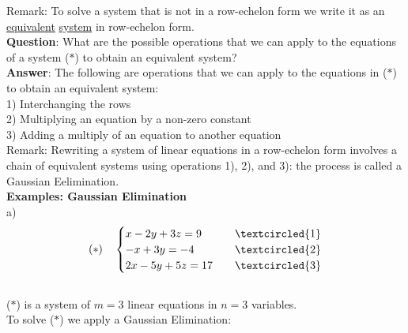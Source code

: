\documentclass{jhwhw}
\begin{document}
Remark: To solve a system that is not in a row-echelon form we write it as an \underline{equivalent} \underline{system} in row-echelon form.
\\

\textbf{Question}: What are the possible operations that we can apply to the equations of a system (\(\ast\)) to obtain an equivalent system?
\\
\textbf{Answer}: The following are operations that we can apply to the equations in (\(\ast\)) to obtain an equivalent system:\\
1) Interchanging the rows \\
2) Multiplying an equation by a non-zero constant \\
3) Adding a multiply of an equation to another equation
\\

 Remark: Rewriting a system of linear equations in a row-echelon form involves a chain of equivalent systems using operations 1), 2), and 3): the process is called a Gaussian Eelimination.
 \\

\textbf{Examples: Gaussian Elimination}
\\

a) \begin{align*} 
(\ast) \quad \begin{cases} x-2y+3z=9 & \quad \textcircled{1} \\ -x+3y=-4 & \quad \textcircled{2} \\ 2x-5y+5z=17 & \quad \textcircled{3} \end{cases}
\end{align*}
\\
(\(\ast\)) is a system of \(m=3\) linear equations in \(n=3\) variables.
\\
To solve (\(\ast\)) we apply a Gaussian Elimination:
\\
\end{document}
